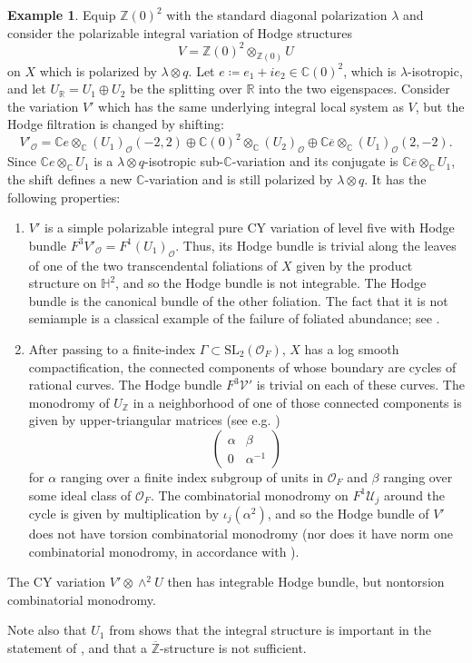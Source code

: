 \documentclass{amsart}
\newcommand{\ol}{\overline}
\theoremstyle{definition}
\newtheorem{eg}[theorem]{Example}
\theoremstyle{remark}
\def\bH{\mathbb{H}}
\def\bZ{\mathbb{Z}}
\def\bR{\mathbb{R}}
\def\bC{\mathbb{C}}
\def\cO{\mathcal{O}}
\def\cU{\mathcal{U}}
\def\cV{\mathcal{V}}
\def\SL{\mathrm{SL}}
\renewcommand{\bar}[1]{\ol{#1}}
\numberwithin{equation}{section}
\begin{document}
\begin{eg}
 
 Equip $\bZ(0)^2$ with the standard diagonal polarization $\lambda$ and consider the polarizable integral variation of Hodge structures  
 \[V = \bZ(0)^2\otimes_{\bZ(0)} U\]
 on $X$ which is polarized by $\lambda\otimes q$.  Let $e\coloneqq  e_1+ie_2\in\bC(0)^2$, which is $\lambda$-isotropic, and let $U_\bR=U_1\oplus U_2$ be the splitting over $\bR$ into the two eigenspaces.  Consider the variation $V'$ which has the same underlying integral local system as $V$, but the Hodge filtration is changed by shifting: 
 \[V'_\cO= \bC e\otimes_\bC (U_1)_\cO(-2,2)\oplus \bC(0)^2\otimes_\bC (U_2)_\cO \oplus \bC\bar e\otimes_\bC (U_1)_\cO(2,-2).\]
 Since $\bC e\otimes_\bC U_1$ is a $\lambda\otimes q$-isotropic sub-$\bC$-variation and its conjugate is $\bC \bar e\otimes_\bC U_1$, the shift defines a new $\bC$-variation and is still polarized by $\lambda\otimes q$.  It has the following properties:
 \begin{enumerate}
 \item $V'$ is a simple polarizable integral pure CY variation of level five with Hodge bundle $F^3V'_\cO=F^1(U_1)_\cO$. Thus, its Hodge bundle is trivial along the leaves of one of the two transcendental foliations of $X$ given by the product structure on $\bH^2$, and so the Hodge bundle is not integrable. The Hodge bundle is the canonical bundle of the other foliation. The fact that it is not semiample is a classical example of the failure of foliated abundance; see \cite[Example IV.5.5]{McQuillan2008}. 
 \item After passing to a finite-index $\Gamma\subset\SL_2(\cO_F)$, $X$ has a log smooth compactification, the connected components of whose boundary are cycles of rational curves.  The Hodge bundle $F^3\cV'$ is trivial on each of these curves.  The monodromy of $U_\bZ$ in a neighborhood of one of those connected components is given by upper-triangular matrices (see e.g. \cite[$\S$I.5]{amrt})
 \[\begin{pmatrix}\alpha&\beta\\0&\alpha^{-1}\end{pmatrix}\]
 for $\alpha$ ranging over a finite index subgroup of units in $\cO_F$ and $\beta$ ranging over some ideal class of $\cO_F$.  The combinatorial monodromy on $F^1\cU_j$ around the cycle is given by multiplication by $\iota_j(\alpha^2)$, and so the Hodge bundle of $V'$ does not have torsion combinatorial monodromy (nor does it have norm one combinatorial monodromy, in accordance with ). 
 \end{enumerate}
 The CY variation $V'\otimes \wedge^2 U$ then has integrable Hodge bundle, but nontorsion combinatorial monodromy. 
\end{eg}
Note also that $U_1$ from  shows that the integral structure is important in the statement of , and that a $\bar \bZ$-structure is not sufficient.
\end{document}
